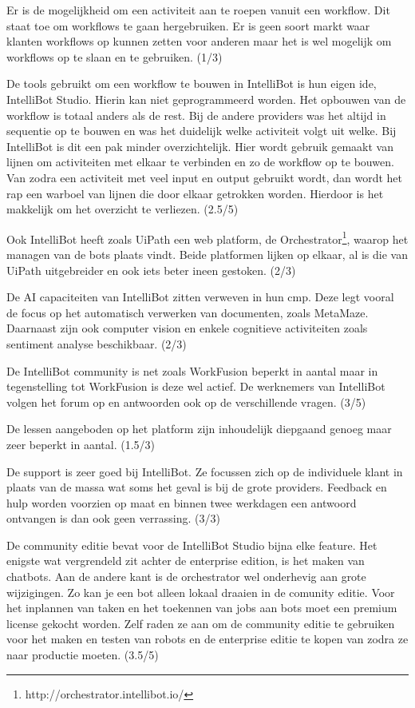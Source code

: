 Er is de mogelijkheid om een activiteit aan te roepen vanuit een workflow. Dit staat toe om workflows te gaan hergebruiken. Er is geen soort markt waar klanten workflows op kunnen zetten voor anderen maar het is wel mogelijk om workflows op te slaan en te gebruiken. (1/3)

De tools gebruikt om een workflow te bouwen in IntelliBot is hun eigen ide, IntelliBot Studio. Hierin kan niet geprogrammeerd worden. Het opbouwen van de workflow is totaal anders als de rest. Bij de andere providers was het altijd in sequentie op te bouwen en was het duidelijk welke activiteit volgt uit welke. Bij IntelliBot is dit een pak minder overzichtelijk. Hier wordt gebruik gemaakt van lijnen om activiteiten met elkaar te verbinden en zo de workflow op te bouwen. Van zodra een activiteit met veel input en output gebruikt wordt, dan wordt het rap een warboel van lijnen die door elkaar getrokken worden. Hierdoor is het makkelijk om het overzicht te verliezen. (2.5/5)

Ook IntelliBot heeft zoals UiPath een web platform, de Orchestrator\footnote{http://orchestrator.intellibot.io/}, waarop het managen van de bots plaats vindt. Beide platformen lijken op elkaar, al is die van UiPath uitgebreider en ook iets beter ineen gestoken. (2/3)

De AI capaciteiten van IntelliBot zitten verweven in hun \acrfull{cmp}. Deze legt vooral de focus op het automatisch verwerken van documenten, zoals MetaMaze. Daarnaast zijn ook computer vision en enkele cognitieve activiteiten zoals sentiment analyse beschikbaar. (2/3)

De IntelliBot community is net zoals WorkFusion beperkt in aantal maar in tegenstelling tot WorkFusion is deze wel actief. De werknemers van IntelliBot volgen het forum op en antwoorden ook op de verschillende vragen. (3/5)

De lessen aangeboden op het platform zijn inhoudelijk diepgaand genoeg maar zeer beperkt in aantal. (1.5/3)

De support is zeer goed bij IntelliBot. Ze focussen zich op de individuele klant in plaats van de massa wat soms het geval is bij de grote providers. Feedback en hulp worden voorzien op maat en binnen twee werkdagen een antwoord ontvangen is dan ook geen verrassing. (3/3)

De community editie bevat voor de IntelliBot Studio bijna elke feature. Het enigste wat vergrendeld zit achter de enterprise edition, is het maken van chatbots. Aan de andere kant is de orchestrator wel onderhevig aan grote wijzigingen. Zo kan je een bot alleen lokaal draaien in de comunity editie. Voor het inplannen van taken en het toekennen van jobs aan bots moet een premium license gekocht worden. Zelf raden ze aan om de community editie te gebruiken voor het maken en testen van robots en de enterprise editie te kopen van zodra ze naar productie moeten. (3.5/5) 

